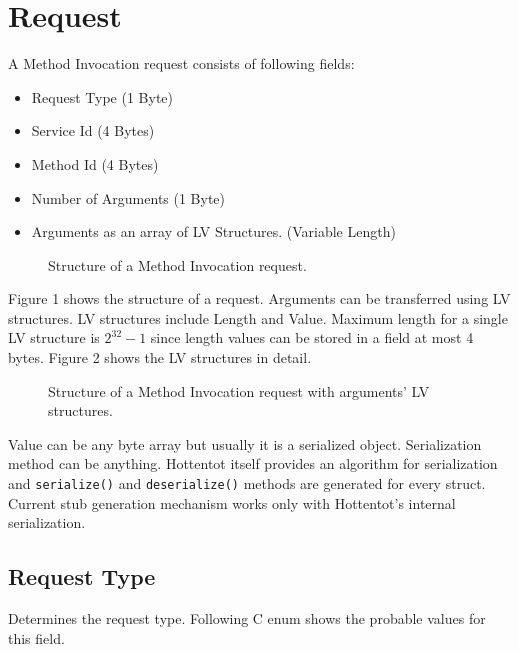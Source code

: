 \documentclass[10pt,a4paper]{article}
\begin{document}
\section {Request}
A Method Invocation request consists of following fields:
\begin{itemize}
  \item Request Type (1 Byte)
  \item Service Id (4 Bytes)
  \item Method Id (4 Bytes)
  \item Number of Arguments (1 Byte)
  \item Arguments as an array of LV Structures. (Variable Length)
\end{itemize}

\begin{figure}[!ht]
  \caption{Structure of a Method Invocation request.}
  \centering
\end{figure}

Figure 1 shows the structure of a request. Arguments can be transferred using LV structures. LV structures include Length and Value. Maximum length for a single LV structure is $2^{32} - 1$ since length values can be stored in a field at most 4 bytes. Figure 2 shows the LV structures in detail.

\begin{figure}[!ht]
  \caption{Structure of a Method Invocation request with arguments' LV structures.}
  \centering
\end{figure}

Value can be any byte array but usually it is a serialized object. Serialization method can be anything. Hottentot itself provides an algorithm for serialization and \texttt {serialize()} and \texttt {deserialize()} methods are generated for every struct. Current stub generation mechanism works only with Hottentot's internal serialization.

\subsection {Request Type}
Determines the request type. Following C enum shows the probable values for this field.
\end{document}
